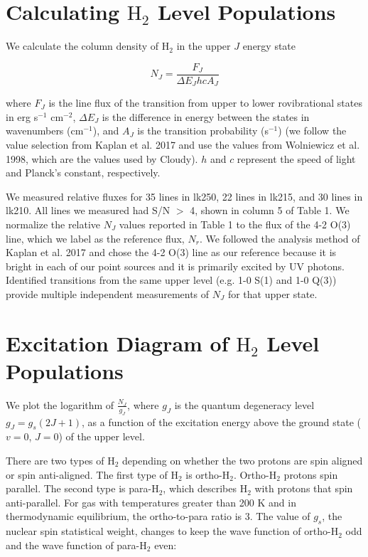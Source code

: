 \documentclass[12pt, letterpaper]{book}
\begin{document}
\section{Calculating $\textrm{H}_2$ Level Populations}
We calculate the column density of $\textrm{H}_2$ in the upper $J$ energy state

\begin{equation} \label{eq:col_dense}
	N_J = \frac{F_J}{\Delta E_J h c A_J}
\end{equation}

\noindent where $F_J$ is the line flux of the transition from upper to lower rovibrational states in erg s$^{-1}$ cm$^{-2}$, $\Delta E_J$ is the difference in energy between the states in wavenumbers (cm$^{-1}$), and $A_J$ is the transition probability (s$^{-1}$) (we follow the value selection from Kaplan et al. 2017 and use the values from Wolniewicz et al. 1998, which are the values used by Cloudy). $h$ and $c$ represent the speed of light and Planck's constant, respectively.

We measured relative fluxes for 35 lines in lk250, 22 lines in lk215, and 30 lines in lk210. All lines we measured had S/N $>$ 4, shown in column 5 of Table 1. We normalize the relative $N_J$ values reported in Table 1 to the flux of the 4-2 O(3) line, which we label as the reference flux, $N_r$. We followed the analysis method of Kaplan et al. 2017 and chose the 4-2 O(3) line as our reference because it is bright in each of our point sources and it is primarily excited by UV photons. Identified transitions from the same upper level (e.g. 1-0 S(1) and 1-0 Q(3)) provide multiple independent measurements of $N_J$ for that upper state.

\section{Excitation Diagram of $\textrm{H}_2$ Level Populations}
We plot the logarithm of $\frac{N_J}{g_J}$, where $g_J$ is the quantum degeneracy level $g_J = g_s(2J + 1)$, as a function of the excitation energy above the ground state ($v = 0$, $J = 0$) of the upper level.

There are two types of $\textrm{H}_2$ depending on whether the two protons are spin aligned or spin anti-aligned. The first type of $\textrm{H}_2$ is ortho-$\textrm{H}_2$. Ortho-$\textrm{H}_2$ protons spin parallel. The second type is para-$\textrm{H}_2$, which describes $\textrm{H}_2$ with protons that spin anti-parallel. For gas with temperatures greater than 200 K and in thermodynamic equilibrium, the ortho-to-para ratio is 3. The value of $g_s$, the nuclear spin statistical weight, changes to keep the wave function of ortho-$\textrm{H}_2$ odd and the wave function of para-$\textrm{H}_2$ even:
\end{document}
